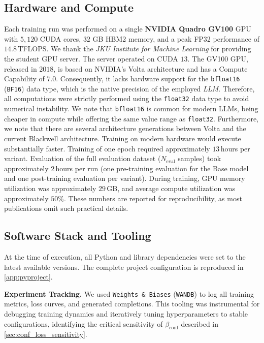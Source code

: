 \documentclass[a4paper,oneside,10pt,ngerman,english]{scrartcl}
\begin{document}
\subsection{Hardware and Compute}
\label{sec:hardware}
Each training run was performed on a single \textbf{NVIDIA Quadro GV100} GPU with $5{,}120$ CUDA cores, $32$ GB HBM2 memory, and a peak FP32 performance of $14.8\,$TFLOPS. We thank the \textit{JKU Institute for Machine Learning} for providing the student GPU server. The server operated on CUDA $13$. The GV100 GPU, released in $2018$, is based on NVIDIA's Volta architecture and has a Compute Capability of $7.0$. Consequently, it lacks hardware support for the \texttt{bfloat16} (\texttt{BF16}) data type, which is the native precision of the employed \textit{LLM}. Therefore, all computations were strictly performed using the \texttt{float32} data type to avoid numerical instability. We note that \texttt{bfloat16} is common for modern LLMs, being cheaper in compute while offering the same value range as \texttt{float32}.
Furthermore, we note that there are several architecture generations between Volta and the current Blackwell architecture. Training on modern hardware would execute substantially faster. Training of one epoch required approximately $13\,$hours per variant. Evaluation of the full evaluation dataset ($N_{\mathrm{eval}}$ samples) took approximately $2\,$hours per run (one pre-training evaluation for the Base model and one post-training evaluation per variant). During training, GPU memory utilization was approximately $29\,$GB, and average compute utilization was approximately $50\%$. These numbers are reported for reproducibility, as most publications omit such practical details.

\subsection{Software Stack and Tooling}
\label{sec:software}
At the time of execution, all Python and library dependencies were set to the latest available versions. The complete project configuration is reproduced in \autoref{app:pyproject}.

\textbf{Experiment Tracking.} We used \texttt{Weights \& Biases} (\texttt{WANDB}) \citep{wandb} to log all training metrics, loss curves, and generated completions. This tooling was instrumental for debugging training dynamics and iteratively tuning hyperparameters to stable configurations, identifying the critical sensitivity of $\beta_{\mathrm{conf}}$ described in \autoref{sec:conf_loss_sensitivity}.
\end{document}
